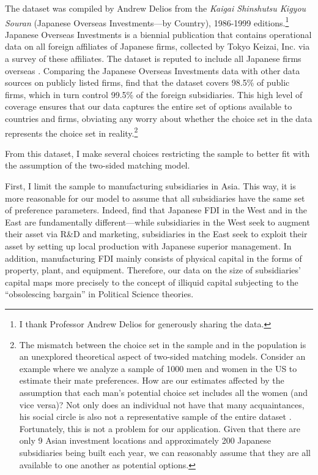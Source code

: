 The dataset was compiled by Andrew Delios from the \textit{Kaigai Shinshutsu
  Kigyou Souran} (Japanese Overseas Investments---by Country), 1986-1999
editions.\footnote{I thank Professor Andrew Delios for generously
  sharing the data.} Japanese Overseas Investments is a biennial publication that contains operational data on all foreign affiliates
of Japanese firms, collected by Tokyo Keizai, Inc. via a survey of these
affiliates. The dataset is reputed to include all Japanese firms overseas
\citep{Yamawaki1991}. Comparing the Japanese Overseas Investments data with other
data sources on publicly listed firms, \citet{Delios2001} find that the dataset
covers 98.5\% of public firms, which in turn control 99.5\% of the foreign
subsidiaries. This high level of coverage ensures that our data captures the
entire set of options available to countries and firms, obviating any worry
about whether the choice set in the data represents the choice set in
reality.\footnote{The mismatch between the choice set in the sample and in the
  population is an unexplored theoretical aspect of two-sided matching models.
  Consider an example where we analyze a sample of 1000 men and women in the US
  to estimate their mate preferences. How are our estimates affected by the 
  assumption that each man's potential choice set includes all the women
  (and vice versa)? Not only does an individual not have that many
  acquaintances, his social circle is also not a representative sample of the
  entire dataset \citep[568]{Logan2008}. Fortunately, this is not a problem for
  our application. Given that there are only 9 Asian investment locations and
  approximately 200 Japanese subsidiaries being built each year, we can
  reasonably assume that they are all available to one another as potential
  options.}

From this dataset, I make several choices restricting the sample to better fit
with the assumption of the two-sided matching model.

First, I limit the sample to manufacturing subsidiaries in Asia. This way, it is
more reasonable
for our model to assume
that all subsidiaries have the same set of preference parameters. Indeed,
\citet{Pak2005} find that Japanese FDI in the West and in the East are
fundamentally different---while subsidiaries in the West seek
to augment their asset via R\&D and marketing, subsidiaries in the East seek to exploit their
asset by setting up local production with Japanese superior management. In addition, manufacturing FDI mainly
consists of physical capital in the forms of property, plant, and equipment.
Therefore, our data on the size of subsidiaries' capital maps more precisely to the
concept of illiquid capital subjecting to the ``obsolescing bargain'' in
Political Science theories.

